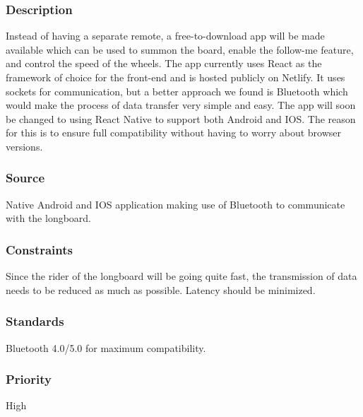 \subsubsection{Description}
Instead of having a separate remote, a free-to-download app will be made available which can be used to summon the board, enable the follow-me feature, and control the speed of the wheels. The app currently uses React as the framework of choice for the front-end and is hosted publicly on Netlify. It uses sockets for communication, but a better approach we found is Bluetooth which would make the process of data transfer very simple and easy. The app  will soon be changed to using React Native to support both Android and IOS. The reason for this is to ensure full compatibility without having to worry about browser versions.
\subsubsection{Source}
Native Android and IOS application making use of Bluetooth to communicate with the longboard.
\subsubsection{Constraints}
Since the rider of the longboard will be going quite fast, the transmission of data needs to be reduced as much as possible. Latency should be minimized.
\subsubsection{Standards}
Bluetooth 4.0/5.0 for maximum compatibility.
\subsubsection{Priority}
High
